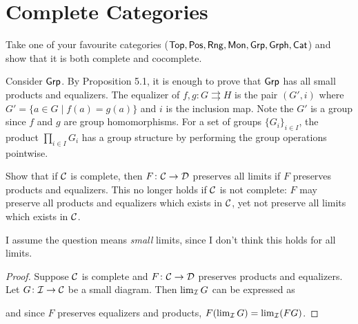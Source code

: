 \section{Complete Categories}

\begin{exercise}{42}
    Take one of your favourite categories ($\normalfont\mathsf{Top}, \normalfont\mathsf{Pos}, \normalfont\mathsf{Rng}, \normalfont\mathsf{Mon}, \normalfont\mathsf{Grp}, \normalfont\mathsf{Grph}, \normalfont\mathsf{Cat}$) and show that it is both complete and cocomplete.
\end{exercise}
\begin{solution}
    Consider $\normalfont\mathsf{Grp}$. 
    By Proposition 5.1, it is enough to prove that $\normalfont\mathsf{Grp}$ has all small products and equalizers.
    The equalizer of $f,g\colon G\rightrightarrows  H$ is the pair $(G', i)$ where $G'=\{a\in G\mid f(a)=g(a)\}$ and $i$ is the inclusion map.
    Note the $G'$ is a group since $f$ and $g$ are group homomorphisms.
    For a set of groups $\{G_i\}_{i\in I}$, the product $\prod_{i\in I} G_i$ has a group structure by performing the group operations pointwise.
\end{solution}

\begin{exercise}{43}
    Show that if $\mathcal{C}$ is complete, then $F\colon\mathcal{C}\to\mathcal{D}$ preserves all limits if $F$ preserves products and equalizers.
    This no longer holds if $\mathcal{C}$ is not complete: $F$ may preserve all products and equalizers which exists in $\mathcal{C}$, yet not preserve all limits which exists in $\mathcal{C}$.
\end{exercise}
\begin{solution}
    I assume the question means \textit{small} limits, since I don't think this holds for all limits.
    \begin{proof}
        Suppose $\mathcal{C}$ is complete and $F\colon\mathcal{C}\to\mathcal{D}$ preserves products and equalizers.
        Let $G\colon\mathcal{I}\to\mathcal{C}$ be a small diagram. Then $\lim_{\mathcal{I}} G$ can be expressed as
       \begin{center}
       \end{center}
       and since $F$ preserves equalizers and products, $F(\lim_{\mathcal{I}} G)=\lim_{\mathcal{I}} (FG)$.
    \end{proof}
\end{solution}

